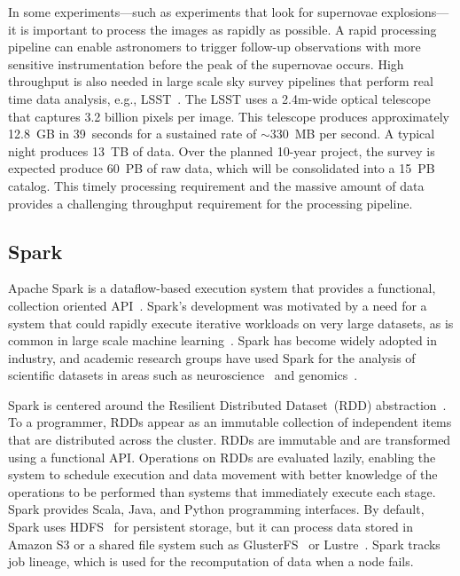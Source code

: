 \documentclass[conference]{IEEEtran}
\begin{document}
In some experiments---such as experiments that look for supernovae explosions---it is important to process
the images as rapidly as possible. A rapid processing pipeline can enable astronomers to trigger follow-up
observations with more sensitive instrumentation before the peak of the supernovae occurs.
High throughput is also needed in large scale
sky survey pipelines that perform real time data analysis, e.g., LSST~\cite{ivezic08}.
The LSST uses a 2.4m-wide optical telescope that captures 3.2 billion pixels per
image. This telescope produces approximately 12.8~GB in 39~seconds
for a sustained rate of $\sim$330~MB per second. A typical night produces 13~TB of data. 
Over the planned 10-year project, the survey is expected produce 60~PB of raw data, which will be consolidated into a 15~PB catalog.
This timely processing requirement and the massive amount of data provides a challenging throughput requirement for the 
processing pipeline. 

\subsection{Spark}
Apache Spark is a dataflow-based execution system that provides a functional, collection
oriented API~\cite{zaharia12}. Spark's development was motivated by a need for a
system that could rapidly execute iterative workloads on very large datasets, as is common
in large scale machine learning~\cite{zaharia10}. Spark has
become widely adopted in industry, and academic research groups have used Spark
for the analysis of scientific datasets in areas such as neuroscience~\cite{freeman14} and genomics~\cite{nothaft15}.

Spark is centered around the Resilient Distributed Dataset~(RDD) abstraction~\cite{zaharia12}.
To a programmer, RDDs appear as an immutable collection of independent items that are 
distributed across the cluster. RDDs are immutable and are transformed using a
functional API. Operations on RDDs are evaluated lazily, enabling the system to schedule 
execution and data movement with better knowledge of the operations to be performed than 
systems that immediately execute each stage. Spark provides Scala, Java, and Python programming interfaces.
By default, Spark uses HDFS~\cite{shvachko10} for persistent storage, but
it can process data stored in Amazon S3 or a shared file system such as
GlusterFS~\cite{davies13} or Lustre~\cite{donovan03}. Spark tracks job lineage, which is used for the
recomputation of data when a node fails. 
\end{document}
